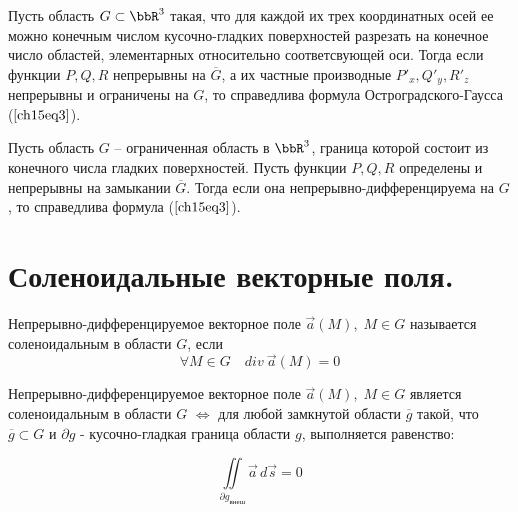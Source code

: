 \begin{thm}
Пусть область $G \subset \bbR^3$ такая, что для каждой их трех координатных осей ее можно конечным числом кусочно-гладких поверхностей разрезать на конечное число областей, элементарных относительно соответсвующей оси. Тогда если функции $P,Q,R$ непрерывны на $\overline{G}$, а их частные производные $P'_x, Q'_y, R'_z$ непрерывны и ограничены на $G$, то справедлива формула Остроградского-Гаусса ($\ref{ch15eq3}$).
\end{thm}

\begin{thm}
Пусть область $G$ -- ограниченная область в $\bbR^3$, граница которой состоит из конечного числа гладких поверхностей. Пусть функции $P,Q,R$ определены и непрерывны на замыкании $\overline{G}$. Тогда если она непрерывно-дифференцируема на $G$, то справедлива формула ($\ref{ch15eq3}$).
\end{thm}
\section{Соленоидальные векторные поля.}

\begin{defn}
Непрерывно-дифференцируемое векторное поле $\overset{\to}{a}(M), \; M \in G$ называется соленоидальным в области $G$, если 
\begin{equation} \label{ch15.2eq1}
\forall M \in G \quad div \: \overset{\to}{a}(M) = 0
\end{equation}
\end{defn}

\begin{thm}
Непрерывно-дифференцируемое векторное поле $\overset{\to}{a}(M), \; M \in G$ является соленоидальным в области $G$ $\Leftrightarrow$ для любой замкнутой области $\overline{g}$ такой, что $\overline{g} \subset G$ и $\partial g$ - кусочно-гладкая граница области $g$, выполняется равенство:

\begin{equation} \label{ch15.2eq2}
\iint\limits_{\partial g_{\textit{внеш}}} \overset{\to}{a} \,d\overset{\to}{s} = 0
\end{equation}
\end{thm}

